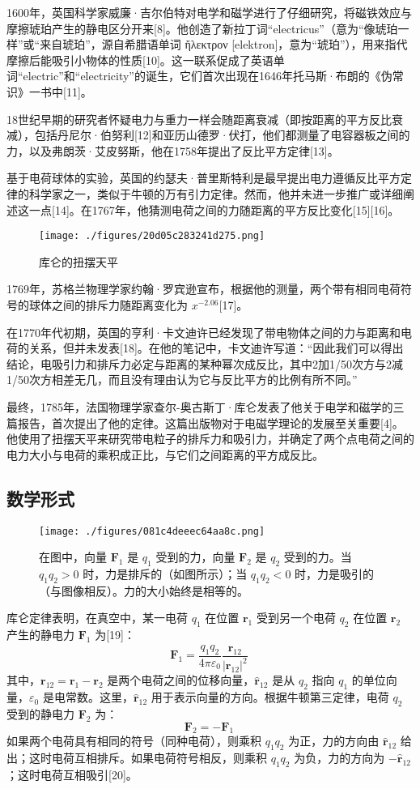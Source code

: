 1600年，英国科学家威廉·吉尔伯特对电学和磁学进行了仔细研究，将磁铁效应与摩擦琥珀产生的静电区分开来[8]。他创造了新拉丁词“electricus”（意为“像琥珀一样”或“来自琥珀”，源自希腊语单词 ἤλεκτρον [elektron]，意为“琥珀”），用来指代摩擦后能吸引小物体的性质[10]。这一联系促成了英语单词“electric”和“electricity”的诞生，它们首次出现在1646年托马斯·布朗的《伪常识》一书中[11]。

18世纪早期的研究者怀疑电力与重力一样会随距离衰减（即按距离的平方反比衰减），包括丹尼尔·伯努利[12]和亚历山德罗·伏打，他们都测量了电容器板之间的力，以及弗朗茨·艾皮努斯，他在1758年提出了反比平方定律[13]。

基于电荷球体的实验，英国的约瑟夫·普里斯特利是最早提出电力遵循反比平方定律的科学家之一，类似于牛顿的万有引力定律。然而，他并未进一步推广或详细阐述这一点[14]。在1767年，他猜测电荷之间的力随距离的平方反比变化[15][16]。
\begin{figure}[ht]
\centering
\texttt{[image: ./figures/20d05c283241d275.png]}
\caption{库仑的扭摆天平} \label{fig_KL_3}
\end{figure}
1769年，苏格兰物理学家约翰·罗宾逊宣布，根据他的测量，两个带有相同电荷符号的球体之间的排斥力随距离变化为 \(x^{-2.06}\)[17]。

在1770年代初期，英国的亨利·卡文迪许已经发现了带电物体之间的力与距离和电荷的关系，但并未发表[18]。在他的笔记中，卡文迪许写道：“因此我们可以得出结论，电吸引力和排斥力必定与距离的某种幂次成反比，其中2加1/50次方与2减1/50次方相差无几，而且没有理由认为它与反比平方的比例有所不同。”

最终，1785年，法国物理学家查尔-奥古斯丁·库仑发表了他关于电学和磁学的三篇报告，首次提出了他的定律。这篇出版物对于电磁学理论的发展至关重要[4]。他使用了扭摆天平来研究带电粒子的排斥力和吸引力，并确定了两个点电荷之间的电力大小与电荷的乘积成正比，与它们之间距离的平方成反比。
\subsection{数学形式}
\begin{figure}[ht]
\centering
\texttt{[image: ./figures/081c4deeec64aa8c.png]}
\caption{在图中，向量 \(\mathbf{F}_1\) 是 \(q_1\) 受到的力，向量 \(\mathbf{F}_2\) 是 \(q_2\) 受到的力。当 \(q_1 q_2 > 0\) 时，力是排斥的（如图所示）；当 \(q_1 q_2 < 0\) 时，力是吸引的（与图像相反）。力的大小始终是相等的。} \label{fig_KL_4}
\end{figure}
库仑定律表明，在真空中，某一电荷 \(q_1\) 在位置 \(\mathbf{r}_1\) 受到另一个电荷 \(q_2\) 在位置 \(\mathbf{r}_2\) 产生的静电力 \(\mathbf{F}_1\) 为[19]：
\[
\mathbf{F}_1 = \frac{q_1 q_2}{4 \pi \varepsilon_0} \frac{\hat{\mathbf{r}}_{12}}{|\mathbf{r}_{12}|^2}~
\]
其中，\(\mathbf{r}_{12} = \mathbf{r}_1 - \mathbf{r}_2\) 是两个电荷之间的位移向量，\(\hat{\mathbf{r}}_{12}\) 是从 \(q_2\) 指向 \(q_1\) 的单位向量，\(\varepsilon_0\) 是电常数。这里，\(\hat{\mathbf{r}}_{12}\) 用于表示向量的方向。根据牛顿第三定律，电荷 \(q_2\) 受到的静电力 \(\mathbf{F}_2\) 为：
\[
\mathbf{F}_2 = -\mathbf{F}_1~
\]
如果两个电荷具有相同的符号（同种电荷），则乘积 \(q_1 q_2\) 为正，力的方向由 \(\hat{\mathbf{r}}_{12}\) 给出；这时电荷互相排斥。如果电荷符号相反，则乘积 \(q_1 q_2\) 为负，力的方向为 \(-\hat{\mathbf{r}}_{12}\)；这时电荷互相吸引[20]。

